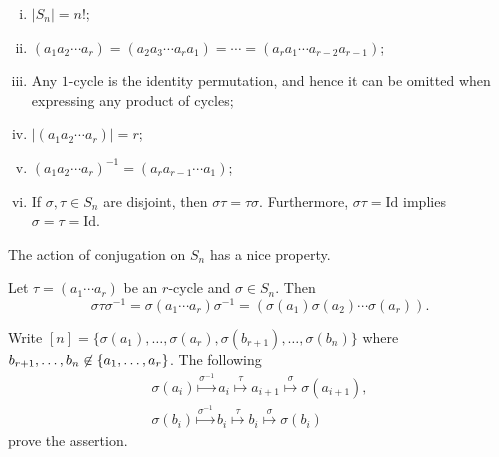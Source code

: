 \begin{proposition} \label{01-prop-1}
	\hfill
	\begin{enumerate}[(i)]
		\item $|S_n| = n!$;
		\item $(a_1a_2\cdots a_r) = (a_2a_3\cdots a_ra_1) = \cdots = (a_ra_1\cdots a_{r-2}a_{r-1})$;
		\item Any $1$-cycle is the identity permutation, and hence it can be omitted when expressing any product of cycles;
		\item $|(a_1a_2\cdots a_r)| = r$;
		\item $(a_1a_2\cdots a_r)^{-1} = (a_ra_{r-1}\cdots a_1)$;
		\item If $\sigma,\tau\in S_n$ are disjoint, then $\sigma\tau = \tau\sigma$. Furthermore, $\sigma \tau = \text{Id}$ implies $\sigma = \tau = \text{Id}$.
	\end{enumerate}
\end{proposition}
The action of conjugation on $S_n$ has a nice property.
\begin{proposition} \label{prop-conjugation-on-S_n}
	Let $\tau = (a_1\cdots a_r)$ be an $r$-cycle and $\sigma\in S_n$. Then \begin{equation*}
		\sigma\tau\sigma^{-1} = \sigma(a_1\cdots a_r)\sigma^{-1} = (\sigma(a_1)\sigma(a_2)\cdots \sigma(a_r)).
	\end{equation*}
\end{proposition}
\begin{sketch}
	Write $[n] = \{\sigma(a_1),\dots, \sigma(a_r), \sigma(b_{r+1}),\dots, \sigma(b_n)\}$ where $b_{r+1},\dots, b_n\not\in \{a_1,\dots,\break a_r\}$. The following
	\begin{gather*}
		\sigma(a_i)\overset{\sigma^{-1}}{\longmapsto}  a_i \overset{\tau}{\longmapsto} a_{i+1}   \overset{\sigma}{\longmapsto}  \sigma(a_{i+1}),
		\\
		\sigma(b_i)\overset{\sigma^{-1}}{\longmapsto}  b_i \overset{\tau}{\longmapsto} b_i   \overset{\sigma}{\longmapsto}  	\sigma(b_i)
	\end{gather*}
	prove the assertion.
\end{sketch}

